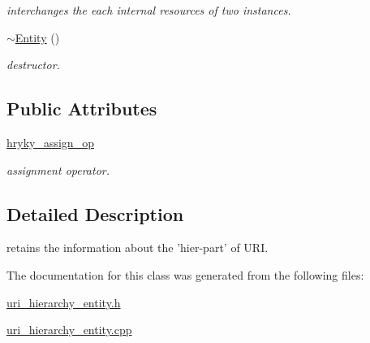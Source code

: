 \begin{DoxyCompactItemize}
\begin{DoxyCompactList}\small\item\em interchanges the each internal resources of two instances. \end{DoxyCompactList}\item 
\hypertarget{classhryky_1_1uri_1_1hierarchy_1_1_entity_a0ab50c2e1f86b80bdc1b6c752bbb41ee}{\hyperlink{classhryky_1_1uri_1_1hierarchy_1_1_entity_a0ab50c2e1f86b80bdc1b6c752bbb41ee}{$\sim$\-Entity} ()}\label{classhryky_1_1uri_1_1hierarchy_1_1_entity_a0ab50c2e1f86b80bdc1b6c752bbb41ee}

\begin{DoxyCompactList}\small\item\em destructor. \end{DoxyCompactList}\end{DoxyCompactItemize}
\subsection*{Public Attributes}
\begin{DoxyCompactItemize}
\item 
\hypertarget{classhryky_1_1uri_1_1hierarchy_1_1_entity_aae42edb2f0d53312cece362364506033}{\hyperlink{classhryky_1_1uri_1_1hierarchy_1_1_entity_aae42edb2f0d53312cece362364506033}{hryky\-\_\-assign\-\_\-op}}\label{classhryky_1_1uri_1_1hierarchy_1_1_entity_aae42edb2f0d53312cece362364506033}

\begin{DoxyCompactList}\small\item\em assignment operator. \end{DoxyCompactList}\end{DoxyCompactItemize}


\subsection{Detailed Description}
retains the information about the 'hier-\/part' of U\-R\-I. 

The documentation for this class was generated from the following files\-:\begin{DoxyCompactItemize}
\item 
\hyperlink{uri__hierarchy__entity_8h}{uri\-\_\-hierarchy\-\_\-entity.\-h}\item 
\hyperlink{uri__hierarchy__entity_8cpp}{uri\-\_\-hierarchy\-\_\-entity.\-cpp}\end{DoxyCompactItemize}
